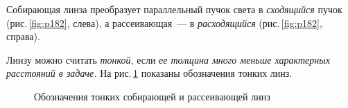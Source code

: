 \documentclass[main.tex]{subfiles}
\begin{document}
Собирающая линза преобразует параллельный пучок света в \emph{сходящийся} пучок (рис.\,\ref{fig:p182}, слева), а рассеивающая~--- в \emph{расходящийся} (рис.\,\ref{fig:p182}, справа).

Линзу можно считать \emph{тонкой}, если \emph{ее толщина много меньше характерных расстояний в задаче.} На рис.\,\ref{fig:p183} показаны обозначения тонких линз. 

    \begin{figure}[H]
    \centering

\caption{Обозначения тонких собирающей и рассеивающей линз}
\label{fig:p183}
\end{figure}















 
\end{document}
